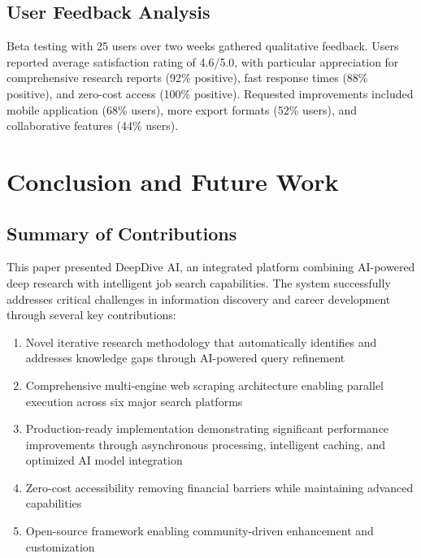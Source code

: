 \documentclass[conference]{IEEEtran}
\begin{document}

\subsection{User Feedback Analysis}

Beta testing with 25 users over two weeks gathered qualitative feedback. Users reported average satisfaction rating of 4.6/5.0, with particular appreciation for comprehensive research reports (92\% positive), fast response times (88\% positive), and zero-cost access (100\% positive). Requested improvements included mobile application (68\% users), more export formats (52\% users), and collaborative features (44\% users).

\section{Conclusion and Future Work}

\subsection{Summary of Contributions}

This paper presented DeepDive AI, an integrated platform combining AI-powered deep research with intelligent job search capabilities. The system successfully addresses critical challenges in information discovery and career development through several key contributions:

\begin{enumerate}
    \item Novel iterative research methodology that automatically identifies and addresses knowledge gaps through AI-powered query refinement
    \item Comprehensive multi-engine web scraping architecture enabling parallel execution across six major search platforms
    \item Production-ready implementation demonstrating significant performance improvements through asynchronous processing, intelligent caching, and optimized AI model integration
    \item Zero-cost accessibility removing financial barriers while maintaining advanced capabilities
    \item Open-source framework enabling community-driven enhancement and customization
\end{enumerate}
\end{document}
